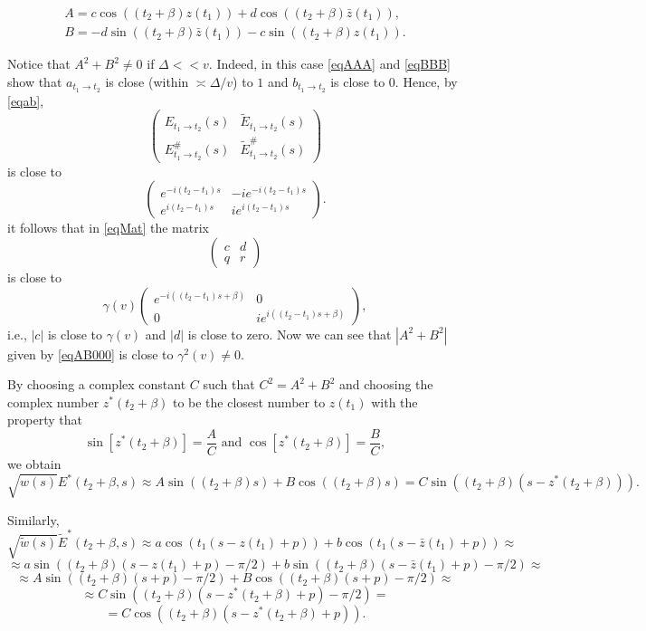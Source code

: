 \documentclass[11pt,twoside,reqno]{amsart}
\def\ti{\tilde}
\def\to{\rightarrow}
\def\DD{{\mathcal{D}}}
\def\DD{\Delta}
\def\g{\gamma}
\def\b{\beta}
\theoremstyle{plain}
\numberwithin{equation}{section}
\begin{document}
\begin{equation}\begin{gathered}A=c\cos ((t_2+\b)z(t_1))+d\cos ((t_2+\b)\bar z(t_1)),\\ B= -d\sin ((t_2+\b)\bar z(t_1))-c\sin ((t_2+\b)z(t_1)).\end{gathered}\label{eqAB000}\end{equation}

Notice that $A^2+B^2\neq 0$ if $\Delta << v$. Indeed, in this case \eqref{eqAAA} and \eqref{eqBBB} show that $a_{t_1\to t_2}$ is close (within $\asymp \DD/v$) to $1$ and $b_{t_1\to t_2}$ is close to 0.  Hence, by \eqref{eqab}, 
$$\begin{pmatrix} E_{t_1\to t_2}(s) & \ti E_{t_1\to t_2}(s) \\ E^\#_{t_1\to t_2}(s)&\ti  E^\#_{t_1\to t_2}(s) \end{pmatrix}
$$
is close to 
$$\begin{pmatrix} e^{-i(t_2-t_1)s} & -ie^{-i(t_2-t_1)s} \\ e^{i(t_2-t_1)s}& ie^{i(t_2-t_1)s}\end{pmatrix}.$$
it follows that in \eqref{eqMat} the matrix
$$\begin{pmatrix} c & d \\ q & r \end{pmatrix}$$
is close to 
$$\gamma(v)\begin{pmatrix} e^{-i((t_2-t_1)s+\b)} & 0 \\ 0& ie^{i((t_2-t_1)s+\b)}\end{pmatrix},$$
i.e., $|c|$ is close to $\gamma(v)$ and $|d|$ is close to zero. Now we can see that $|A^2+B^2|$ given by \eqref{eqAB000} is close to $\g^2(v)\neq 0$. 

By choosing a complex constant $C$ such that $C^2=A^2+B^2$ and choosing the complex number $z^*(t_2+\beta)$ to be the closest number to $z(t_1)$ with the property that 
$$\sin [z^*(t_2+\beta)]=\frac A{C}\text{ and } \cos[ z^*(t_2+\beta)]=\frac B{C},$$
we obtain 
$$\sqrt{w(s)}E^*(t_2+\beta,s)\approx 
A\sin((t_2+\b)s)+B\cos((t_2+\b)s)=C\sin((t_2+\b)(s-z^*(t_2+\beta))).$$




Similarly,
$$\sqrt{\ti w(s)}\ti E^*(t_2+\beta,s)\approx a \cos (t_1(s-z(t_1)+p)) +b\cos (t_1(s-\bar z(t_1)+p))\approx$$
$$\approx a \sin ((t_2+\beta)(s-z(t_1)+p)-\pi/2) +b\sin ((t_2+\beta)(s-\bar z(t_1)+p)-\pi/2)\approx$$
$$\approx A\sin((t_2+\beta)(s+p)-\pi/2)+B\cos((t_2+\beta)(s+p)-\pi/2)\approx$$$$\approx C\sin((t_2+\b)(s-z^*(t_2+\beta)+p)-\pi/2)=$$
$$=C\cos((t_2+\b)(s-z^*(t_2+\beta)+p)).$$
\end{document}
